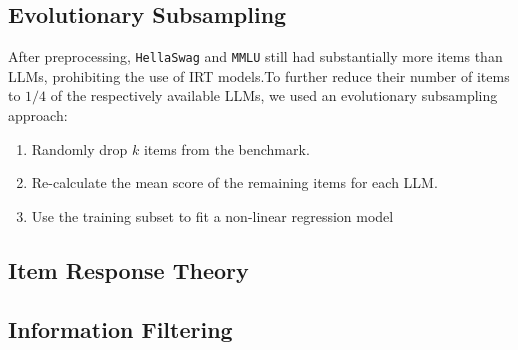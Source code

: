 \documentclass{article}
\begin{document}
\subsection{Evolutionary Subsampling}
After preprocessing, \texttt{HellaSwag} and \texttt{MMLU} still had substantially more items than LLMs, prohibiting the use of IRT models.To further reduce their number of items to $1/4$ of the respectively available LLMs, we used an evolutionary subsampling approach:
\begin{enumerate}
   \item Randomly drop $k$ items from the benchmark.
   \item Re-calculate the mean score of the remaining items for each LLM.
   \item Use the training subset to fit a non-linear regression model
\end{enumerate}

%
\subsection{Item Response Theory}
\subsection{Information Filtering}
\end{document}
